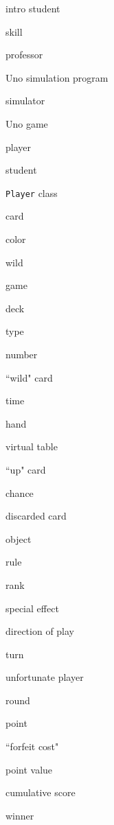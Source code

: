 \begin{samepage}
\begin{multicols}{3}
\small
\begin{compactitem}
\renewcommand\labelitemi{\raisebox{0.25ex}{\tiny$\bullet$}}
\item \textsf{intro student}
\item \textsf{skill}
\item \textsf{professor}
\item \textsf{Uno simulation program}
\item \textsf{simulator}
\item \textsf{Uno game}
\item \textsf{player}
\item \textsf{student}
\item \texttt{Player} \textsf{class}
\item \textsf{card}
\item \textsf{color}
\item \textsf{wild}
\columnbreak
\item \textsf{game}
\item \textsf{deck}
\item \textsf{type}
\item \textsf{number}
\item \textsf{``wild" card}
\item \textsf{time}
\item \textsf{hand}
\item \textsf{virtual table}
\item \textsf{``up" card}
\item \textsf{chance}
\item \textsf{discarded card}
\item \textsf{object}
\columnbreak
\item \textsf{rule}
\item \textsf{rank}
\item \textsf{special effect}
\item \textsf{direction of play}
\item \textsf{turn}
\item \textsf{unfortunate player}
\item \textsf{round}
\item \textsf{point}
\item \textsf{``forfeit cost"}
\item \textsf{point value}
\item \textsf{cumulative score}
\item \textsf{winner}
\end{compactitem}
\end{multicols}
\end{samepage}

